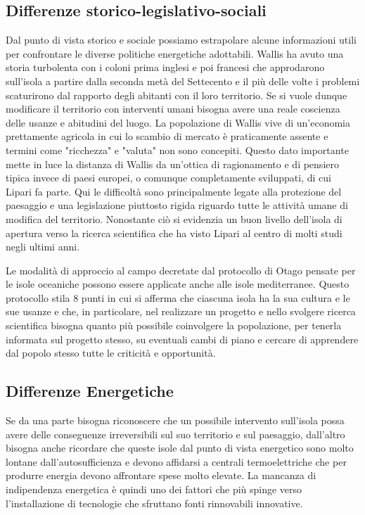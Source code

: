 \documentclass[fleqn,11pt]{SelfArx} %
\begin{document}
\subsection{Differenze storico-legislativo-sociali}
Dal punto di vista storico e sociale possiamo estrapolare alcune informazioni utili per confrontare le diverse politiche energetiche adottabili. Wallis ha avuto una storia turbolenta con i coloni prima inglesi e poi francesi che approdarono sull'isola a partire dalla seconda metà del Settecento e il più delle volte i problemi scaturirono dal rapporto degli abitanti con il loro territorio. Se si vuole dunque modificare il territorio con interventi umani bisogna avere una reale coscienza delle usanze e abitudini del luogo. La popolazione di Wallis vive di un'economia prettamente agricola in cui lo scambio di mercato è praticamente assente e termini come "ricchezza" e "valuta" non sono concepiti. Questo dato importante mette in luce la distanza di Wallis da un'ottica di ragionamento e di pensiero tipica invece di paesi europei, o comunque completamente sviluppati, di cui Lipari fa parte. Qui le difficoltà sono principalmente legate alla protezione del paesaggio e una legislazione piuttosto rigida riguardo tutte le attività umane di modifica del territorio. Nonostante ciò si evidenzia un buon livello dell'isola di apertura verso la ricerca scientifica che ha visto Lipari al centro di molti studi negli ultimi anni.

Le modalità di approccio al campo decretate dal protocollo di Otago pensate per le isole oceaniche possono essere applicate anche alle isole mediterranee. Questo protocollo stila 8 punti in cui si afferma che ciascuna isola ha la sua cultura e le sue usanze e che, in particolare, nel realizzare un progetto e nello svolgere ricerca scientifica bisogna quanto più possibile coinvolgere la popolazione, per tenerla informata sul progetto stesso, su eventuali cambi di piano e cercare di apprendere dal popolo stesso tutte le criticità e opportunità.

\subsection{Differenze Energetiche}
Se da una parte bisogna riconoscere che un possibile intervento sull'isola possa avere delle conseguenze irreversibili sul suo territorio e sul paesaggio, dall'altro bisogna anche ricordare che queste isole dal punto di vista energetico sono molto lontane dall'autosufficienza e devono affidarsi a centrali termoelettriche che per produrre energia devono affrontare spese molto elevate. La mancanza di indipendenza energetica è quindi uno dei fattori che più spinge verso l'installazione di tecnologie che sfruttano fonti rinnovabili innovative.
\end{document}
